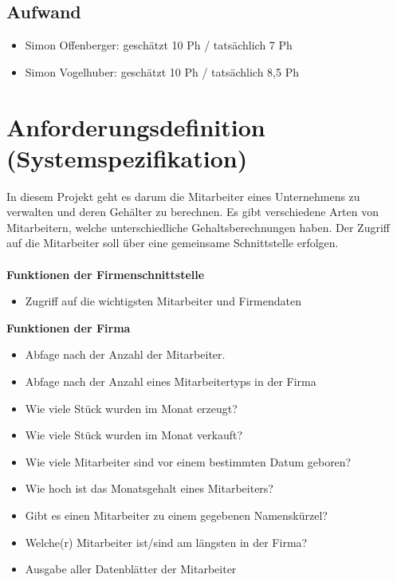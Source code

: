\documentclass[12pt,naustrian,a4widepaper]{scrartcl}
\begin{document}
\subsection{Aufwand}
	
	\begin{itemize}
		\item Simon Offenberger: geschätzt 10 Ph / tatsächlich 7 Ph
		\item Simon Vogelhuber:  geschätzt 10 Ph / tatsächlich 8,5 Ph
	\end{itemize}

\clearpage
\section{Anforderungsdefinition (Systemspezifikation)}
In diesem Projekt geht es darum die Mitarbeiter eines Unternehmens zu verwalten und deren Gehälter zu berechnen.
Es gibt verschiedene Arten von Mitarbeitern, welche unterschiedliche Gehaltsberechnungen haben. 
Der Zugriff auf die Mitarbeiter soll über eine gemeinsame Schnittstelle erfolgen.
\\
\\
\textbf{Funktionen der Firmenschnittstelle}
\begin{itemize}
	\item Zugriff auf die wichtigsten Mitarbeiter und Firmendaten
\end{itemize}

\textbf{Funktionen der Firma}
\begin{itemize}
 \item Abfage nach der Anzahl der Mitarbeiter.
 \item Abfage nach der Anzahl eines Mitarbeitertyps in der Firma
 \item Wie viele Stück wurden im Monat erzeugt?
 \item Wie viele Stück wurden im Monat verkauft?
 \item Wie viele Mitarbeiter sind vor einem bestimmten Datum geboren?
 \item Wie hoch ist das Monatsgehalt eines Mitarbeiters?
 \item Gibt es einen Mitarbeiter zu einem gegebenen Namenskürzel?
 \item Welche(r) Mitarbeiter ist/sind am längsten in der Firma?
 \item Ausgabe aller Datenblätter der Mitarbeiter
\end{itemize}
\end{document}
